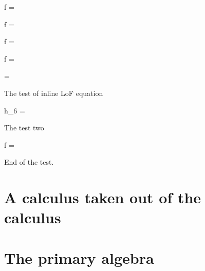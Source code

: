 \documentclass[11pt, a4paper]{book}
\begin{document}
\begin{form}
	f =   
\end{form}

\begin{form}
	f = 
\end{form}

\begin{form}
	f = 
\end{form}

\begin{form}
	f = 
\end{form}

\begin{form}
\end{form}

\begin{form}
\end{form}

\begin{form}
\end{form}

\begin{form}
	 = 
\end{form}

The test of inline LoF equation \begin{forminline}
	h_6 = 
\end{forminline} The test two \begin{forminline}
	f = 
\end{forminline} End of the test.

\newpage
\section{A calculus taken out of the calculus}

\newpage
\section{The primary algebra}
\end{document}
